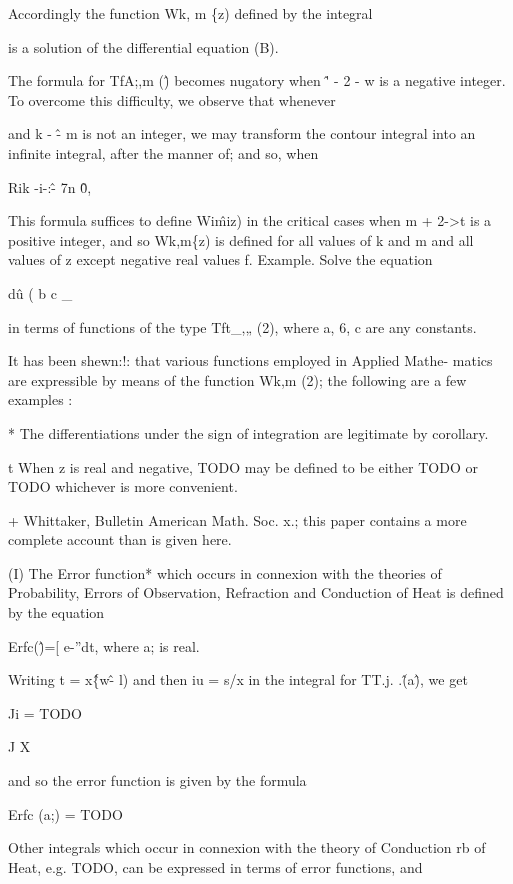 Accordingly the function Wk, m \{z) defined by the integral

is a solution of the differential equation (B).

The formula for TfA;,m (\^) becomes nugatory when \^' - 2 - w is a
negative integer. To overcome this difficulty, we observe that
whenever

and k - \^- m is not an integer, we may transform the contour integral
into an infinite integral, after the manner of; and so, when

Rik -i-:\^- 7n \^0,

This formula suffices to define Wi\^miz) in the critical cases when m
+ 2->t is a positive integer, and so Wk,m\{z) is defined for all
values of k and m and all values of z except negative real values f.
Example. Solve the equation

d\^u ( b c \_

in terms of functions of the type Tft\_,„ (2), where a, 6, c are any
constants.


It has been shewn:!: that various functions employed in Applied Mathe-
matics are expressible by means of the function Wk,m (2); the
following are a few examples :

* The differentiations under the sign of integration are legitimate by corollary.

t When z is real and negative, TODO may be defined to be either TODO
or TODO whichever is more convenient.

+ Whittaker, Bulletin American Math. Soc. x.; this paper contains a
more complete account than is given here.

%
%
(I) The Error function* which occurs in connexion with the theories of
Probability, Errors of Observation, Refraction and Conduction of Heat
is defined by the equation

Erfc(\^)=[ e-''dt, where a; is real.

Writing t = x\^\{w\^ - l) and then iu = s/x in the integral for TT.j.
.\^(a\^), we get

Ji = TODO

J X

and so the error function is given by the formula

Erfc (a;) = TODO

Other integrals which occur in connexion with the theory of Conduction
rb of Heat, e.g. TODO, can be expressed in terms of error functions,
and

